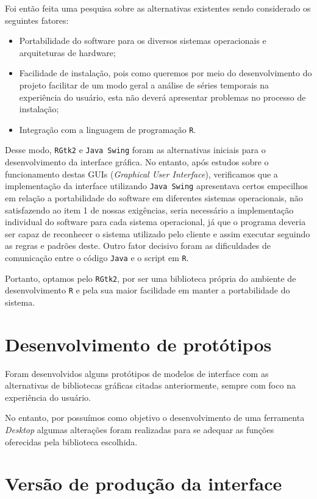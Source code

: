 Foi então feita uma pesquisa sobre as alternativas existentes sendo considerado os seguintes fatores:

\begin{itemize}
\item Portabilidade do software para os diversos sistemas operacionais e arquiteturas de hardware; 
\item Facilidade de instalação, pois como queremos por meio do desenvolvimento do projeto facilitar de um modo geral a análise de séries temporais na experiência do usuário, esta não deverá apresentar problemas no processo de instalação;
\item Integração com a linguagem de programação \texttt R.
\end{itemize}

Desse modo, \texttt{RGtk2} e \texttt{Java Swing} foram as alternativas iniciais para o desenvolvimento da interface gráfica. 
No entanto, após estudos sobre o funcionamento destas GUIs (\textit{Graphical User Interface}), verificamos que a implementação da interface utilizando \texttt{Java Swing} apresentava certos empecilhos em relação a portabilidade do software em diferentes sistemas operacionais, não satisfazendo ao item 1 de nossas exigências, seria necessário a implementação individual do software para cada sistema operacional, já que o programa deveria ser capaz de  reconhecer o sistema utilizado pelo cliente e assim executar seguindo as regras e padrões deste. Outro fator decisivo foram as dificuldades de comunicação entre o código \texttt{Java} e o script em \texttt{R}.

Portanto, optamos pelo \texttt{RGtk2}, por ser uma biblioteca própria do ambiente de desenvolvimento \texttt R e pela sua maior facilidade em manter a portabilidade do sistema.

\section{Desenvolvimento de protótipos}
 
Foram desenvolvidos alguns protótipos de modelos de interface com as alternativas de bibliotecas gráficas citadas anteriormente, sempre com foco na experiência do usuário. 

No entanto, por possuímos como objetivo o desenvolvimento de uma ferramenta \textit{Desktop} algumas alterações foram realizadas para se adequar as funções oferecidas pela biblioteca escolhida.

\section{Versão de produção da interface}


